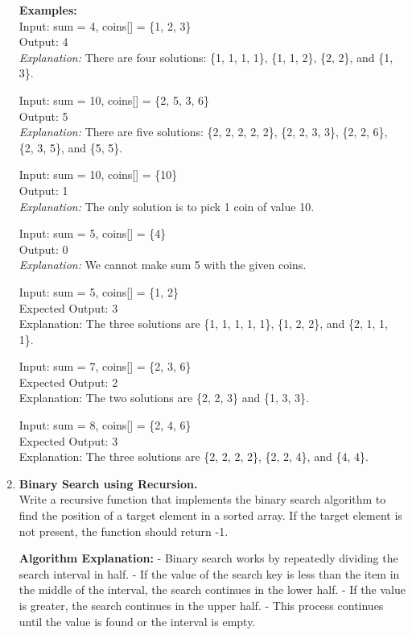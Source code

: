 \documentclass[12pt]{article}
\begin{document}
\begin{enumerate}
    \textbf{Examples:} \\
    Input: sum = 4, coins[] = \{1, 2, 3\} \\
    Output: 4 \\
    \textit{Explanation:} There are four solutions: \{1, 1, 1, 1\}, \{1, 1, 2\}, \{2, 2\}, and \{1, 3\}.
    
    Input: sum = 10, coins[] = \{2, 5, 3, 6\} \\
    Output: 5 \\
    \textit{Explanation:} There are five solutions: \{2, 2, 2, 2, 2\}, \{2, 2, 3, 3\}, \{2, 2, 6\}, \{2, 3, 5\}, and \{5, 5\}.
    
    Input: sum = 10, coins[] = \{10\} \\
    Output: 1 \\
    \textit{Explanation:} The only solution is to pick 1 coin of value 10.
    
    Input: sum = 5, coins[] = \{4\} \\
    Output: 0 \\
    \textit{Explanation:} We cannot make sum 5 with the given coins.
    
    Input: sum = 5, coins[] = \{1, 2\} \\
    Expected Output: 3 \\
    Explanation: The three solutions are \{1, 1, 1, 1, 1\}, \{1, 2, 2\}, and \{2, 1, 1, 1\}.
    
    Input: sum = 7, coins[] = \{2, 3, 6\} \\
    Expected Output: 2 \\
    Explanation: The two solutions are \{2, 2, 3\} and \{1, 3, 3\}.
    
    Input: sum = 8, coins[] = \{2, 4, 6\} \\
    Expected Output: 3 \\
    Explanation: The three solutions are \{2, 2, 2, 2\}, \{2, 2, 4\}, and \{4, 4\}.
    
    \item \textbf{Binary Search using Recursion.} \\
    Write a recursive function that implements the binary search algorithm to find the position of a target element in a sorted array. If the target element is not present, the function should return -1. 
    
    \textbf{Algorithm Explanation:}
    - Binary search works by repeatedly dividing the search interval in half. 
    - If the value of the search key is less than the item in the middle of the interval, the search continues in the lower half. 
    - If the value is greater, the search continues in the upper half. 
    - This process continues until the value is found or the interval is empty.


\end{enumerate}
\end{document}

